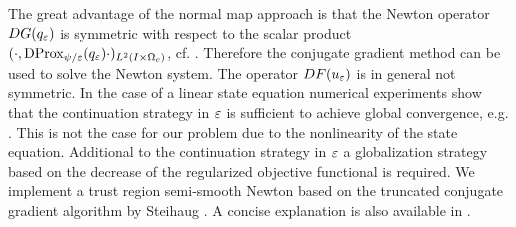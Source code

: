 The great advantage of the normal map approach is that the Newton operator $DG(q_{\varepsilon})$ is symmetric with respect to the scalar product $(\cdot,\operatorname{DProx}_{\psi/ \varepsilon}(q_{\varepsilon})\cdot)_{L^2(I\times\Omega_c)}$, cf. \cite{PieperRund2015,pieperthesis}. Therefore the conjugate gradient method can be used to solve the Newton system. The operator $DF(u_\varepsilon)$ is in general not symmetric. In the case of a linear state equation numerical experiments show that the continuation strategy in $\varepsilon$ is sufficient to achieve global convergence, e.g. \cite{ClasonKunisch:2011b}. This is not the case for our problem due to the nonlinearity of the state equation. Additional to the continuation strategy in $\varepsilon$ a globalization strategy based on the decrease of the regularized objective functional is required. We implement a trust region semi-smooth Newton based on the truncated conjugate gradient algorithm by Steihaug \cite{pieperthesis,steihaug1983}. {\color{red}A concise explanation is also available in \cite[Section 6.2 and A.3]{PieperRund2015}}.

